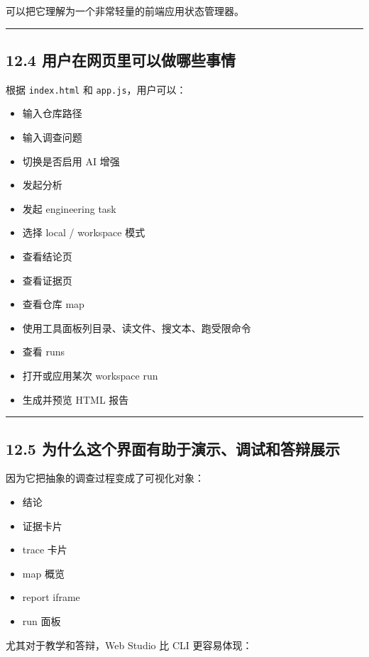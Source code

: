 \documentclass[UTF8,12pt,openany]{ctexbook}
\begin{document}
可以把它理解为一个非常轻量的前端应用状态管理器。\par

\hrule

\subsection{12.4 用户在网页里可以做哪些事情}

根据 \texttt{index.html} 和 \texttt{app.js}，用户可以：\par

\begin{itemize}
\item 输入仓库路径
\item 输入调查问题
\item 切换是否启用 AI 增强
\item 发起分析
\item 发起 engineering task
\item 选择 local / workspace 模式
\item 查看结论页
\item 查看证据页
\item 查看仓库 map
\item 使用工具面板列目录、读文件、搜文本、跑受限命令
\item 查看 runs
\item 打开或应用某次 workspace run
\item 生成并预览 HTML 报告
\end{itemize}

\hrule

\subsection{12.5 为什么这个界面有助于演示、调试和答辩展示}

因为它把抽象的调查过程变成了可视化对象：\par

\begin{itemize}
\item 结论
\item 证据卡片
\item trace 卡片
\item map 概览
\item report iframe
\item run 面板
\end{itemize}

尤其对于教学和答辩，Web Studio 比 CLI 更容易体现：\par
\end{document}
